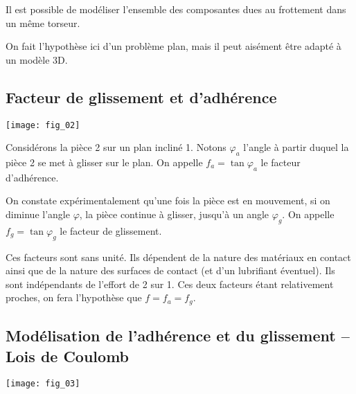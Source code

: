 \begin{remarque}
Il est possible de modéliser l'ensemble des composantes dues au frottement dans un même torseur. 

On fait l'hypothèse ici d'un problème plan, mais il peut aisément être adapté à un modèle 3D. 
\end{remarque}

\subsection{Facteur de glissement et d'adhérence}


\begin{marginfigure}
\begin{center}
\texttt{[image: fig\_02]}
\end{center}
\end{marginfigure}

Considérons la pièce 2 sur un plan incliné 1. Notons $\varphi_a$ l'angle à partir duquel la pièce 2 se met à glisser sur le plan. On appelle  $f_a=\tan\varphi_a$ le facteur d'adhérence.

On constate expérimentalement qu'une fois la pièce est en mouvement, si on diminue l'angle $\varphi$, la pièce continue à glisser, jusqu'à un angle  $\varphi_g$. On appelle \textbf{$f_g=\tan\varphi_g$} le facteur de glissement.



Ces facteurs sont sans unité. Ils dépendent de la nature des matériaux en contact ainsi que de la nature des surfaces de contact (et d'un lubrifiant éventuel). Ils sont indépendants de l'effort de 2 sur 1. Ces deux facteurs étant relativement proches, on fera l'hypothèse que $f=f_a=f_g$. 

\subsection{Modélisation de l'adhérence et du glissement -- Lois de Coulomb}

\begin{marginfigure}
\texttt{[image: fig\_03]}
\end{marginfigure}

